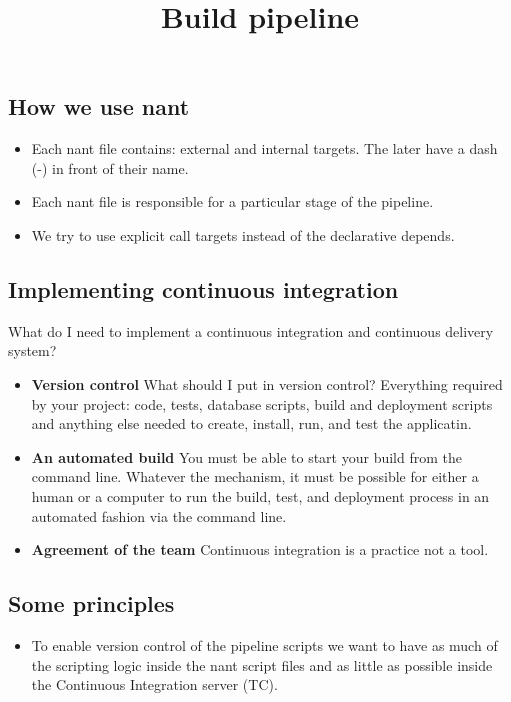 \documentclass{article}
\begin{document}
\title{Build pipeline}

\maketitle

\subsection*{How we use nant}

\begin{itemize}
\item Each nant file contains: external and internal targets. The
  later have a dash (-) in front of their name.
\item Each nant file is responsible for a particular stage of the
  pipeline.
\item We try to use explicit call targets instead of the declarative
  depends.
\end{itemize}



\subsection*{Implementing continuous integration}

What do I need to implement a continuous integration and continuous
delivery system?  

\begin{itemize}
\item \textbf{Version control} What should I put in version control?
  Everything required by your project: code, tests, database scripts,
  build and deployment scripts and anything else needed to create,
  install, run, and test the applicatin.
\item \textbf{An automated build} You must be able to start your build
  from the command line. Whatever the mechanism, it must be possible
  for either a human or a computer to run the build, test, and
  deployment process in an automated fashion via the command line.
\item \textbf{Agreement of the team} Continuous integration is a
  practice not a tool.
\end{itemize}


\subsection*{Some principles}

\begin{itemize}
\item To enable version control of the pipeline scripts we want to
  have as much of the scripting logic inside the nant script files and
  as little as possible inside the Continuous Integration server (TC).
\end{itemize}
\end{document}
